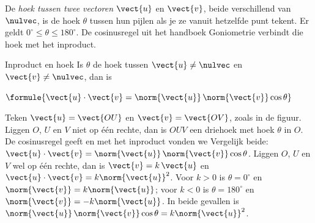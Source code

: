 De \textit{hoek tussen twee vectoren} $\vect{u}$ en $\vect{v}$, beide verschillend van $\nulvec$, is de hoek $\theta$ tussen hun pijlen als je ze vanuit hetzelfde punt tekent. Er geldt $0^\circ \leqslant \theta \leqslant 180^\circ$. De cosinusregel uit het handboek Goniometrie verbindt die hoek met het inproduct.

\begin{theorie}
\begin{minipage}[t]{.62\linewidth}
\vspace{0pt}
\begin{stelling}{Inproduct en hoek}
Is $\theta$ de hoek tussen $\vect{u} \neq \nulvec$ en $\vect{v} \neq \nulvec$, dan is

\vspace{1mm}
\qquad $\formule{\vect{u} \cdot \vect{v} = \norm{\vect{u}}\,\norm{\vect{v}}\cos\theta}$
\end{stelling}
\end{minipage}\hfill
\begin{minipage}[t]{.34\linewidth}
\vspace{2mm}
\centering
{}
\end{minipage}
\begin{bewijs}
Teken $\vect{u} = \vect{OU}$ en $\vect{v} = \vect{OV}$, zoals in de figuur. Liggen $O$, $U$ en $V$ niet op één rechte, dan is $OUV$ een driehoek met hoek $\theta$ in $O$. De cosinusregel geeft
en met het inproduct vonden we
Vergelijk beide: $\vect{u} \cdot \vect{v} = \norm{\vect{u}}\,\norm{\vect{v}}\cos\theta$. Liggen $O$, $U$ en $V$ wel op één rechte, dan is $\vect{v} = k\,\vect{u}$ en $\vect{u} \cdot \vect{v} = k\norm{\vect{u}}^2$. Voor $k > 0$ is $\theta = 0^\circ$ en $\norm{\vect{v}} = k\norm{\vect{u}}$; voor $k < 0$ is $\theta = 180^\circ$ en $\norm{\vect{v}} = -k\norm{\vect{u}}$. In beide gevallen is $\norm{\vect{u}}\,\norm{\vect{v}}\cos\theta = k\norm{\vect{u}}^2$.
\end{bewijs}
\end{theorie}


